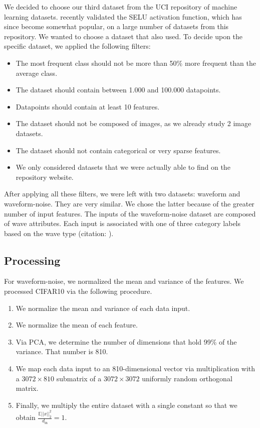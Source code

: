 \documentclass{article} %
\begin{document}
We decided to choose our third dataset from the UCI repository of machine learning datasets. \citet{selu} recently validated the SELU activation function, which has since become somewhat popular, on a large number of datasets from this repository. We wanted to choose a dataset that \citet{selu} also used. To decide upon the specific dataset, we applied the following filters:

\begin{itemize}
\item The most frequent class should not be more than 50\% more frequent than the average class.
\item The dataset should contain between 1.000 and 100.000 datapoints.
\item Datapoints should contain at least 10 features.
\item The dataset should not be composed of images, as we already study 2 image datasets.
\item The dataset should not contain categorical or very sparse features.
\item We only considered datasets that we were actually able to find on the repository website.
\end{itemize}

After applying all these filters, we were left with two datasets: waveform and waveform-noise. They are very similar. We chose the latter because of the greater number of input features. The inputs of the waveform-noise dataset are composed of wave attributes. Each input is associated with one of three category labels based on the wave type (citation: \citet{waveform-noise}).

\subsection{Processing}

For waveform-noise, we normalized the mean and variance of the features. We processed CIFAR10 via the following procedure.

\begin{enumerate}
\item We normalize the mean and variance of each data input. 
\item We normalize the mean of each feature.
\item Via PCA, we determine the number of dimensions that hold 99\% of the variance. That number is 810. 
\item We map each data input to an 810-dimensional vector via multiplication with a $3072 \times 810$ submatrix of a $3072 \times 3072$ uniformly random orthogonal matrix. 
\item Finally, we multiply the entire dataset with a single constant so that we obtain $\frac{\mathbb{E} ||x||_2^2}{d_\text{in}} = 1$.
\end{enumerate}
\end{document}

